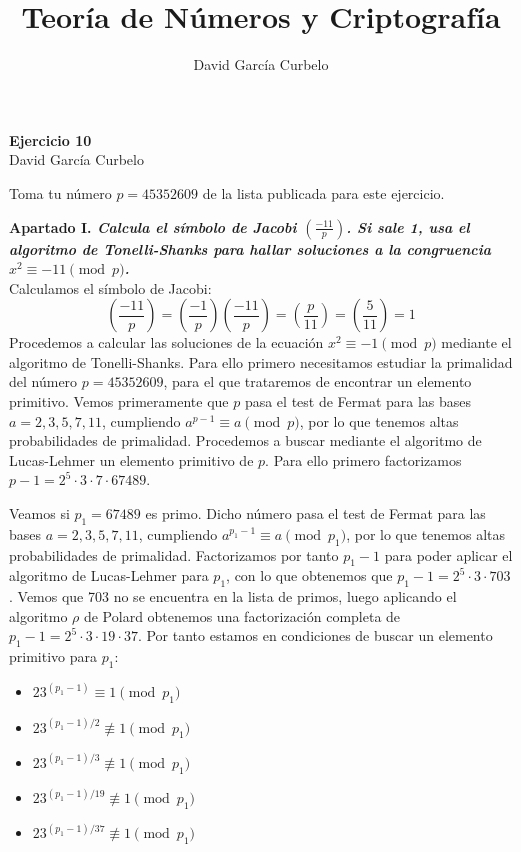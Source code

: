 \documentclass[fleqn]{article}
\author{David García Curbelo}
\title{Teoría de Números y Criptografía}
\begin{document}
    \begin{center}
        \LARGE{\textbf{Ejercicio 10}} \\
        \Large{David García Curbelo} \\
    \end{center}

    \vspace{1cm}
    Toma tu número $p = 45352609$ de la lista publicada para este ejercicio.

    \textbf{Apartado I. \textit{Calcula el símbolo de Jacobi $\left(\frac{-11}{p}\right)$. Si sale 1, usa el algoritmo de 
                                Tonelli-Shanks para hallar soluciones a la congruencia $x^2 \equiv -11 \pmod{p}$.}}\\
    
    Calculamos el símbolo de Jacobi: 
    $$\left(\frac{-11}{p}\right) = \left(\frac{-1}{p}\right) \left(\frac{-11}{p}\right) = \left(\frac{p}{11}\right) 
    = \left(\frac{5}{11}\right) = 1$$
    Procedemos a calcular las soluciones de la ecuación $x^2 \equiv -1 \pmod{p}$ mediante el algoritmo de Tonelli-Shanks.
    Para ello primero necesitamos estudiar la primalidad del número $p = 45352609$, para el que trataremos de encontrar un
    elemento primitivo. Vemos primeramente que $p$ pasa el test de Fermat para las bases $a = 2,3,5,7,11$, cumpliendo
    $a^{p-1} \equiv a \pmod{p}$, por lo que tenemos altas probabilidades de primalidad. Procedemos a buscar mediante el algoritmo
    de Lucas-Lehmer un elemento primitivo de $p$. Para ello primero factorizamos $p - 1 = 2^5 \cdot 3 \cdot 7 \cdot 67489$.
    
    Veamos si $p_1 = 67489$ es primo. Dicho número pasa el test de Fermat para las bases $a = 2,3,5,7,11$, cumpliendo
    $a^{p_1-1} \equiv a \pmod{p_1}$, por lo que tenemos altas probabilidades de primalidad. Factorizamos por tanto $p_1 - 1 $
    para poder aplicar el algoritmo de Lucas-Lehmer para $p_1$, con lo que obtenemos que $p_1 - 1 = 2^5 \cdot 3 \cdot 703$.
    Vemos que 703 no se encuentra en la lista de primos, luego aplicando el algoritmo $\rho$ de Polard obtenemos una factorización 
    completa de  $p_1 - 1 = 2^5 \cdot 3 \cdot 19 \cdot 37$. Por tanto estamos en condiciones de buscar un elemento primitivo para 
    $p_1$: 

    \begin{itemize}
        \item $23^{(p_1 - 1)} \equiv 1 \pmod{p_1}$
        \item $23^{(p_1 - 1)/2} \not\equiv 1 \pmod{p_1}$    
        \item $23^{(p_1 - 1)/3} \not\equiv 1 \pmod{p_1}$
        \item $23^{(p_1 - 1)/19} \not\equiv 1 \pmod{p_1}$
        \item $23^{(p_1 - 1)/37} \not\equiv 1 \pmod{p_1}$
    \end{itemize}
\end{document}
